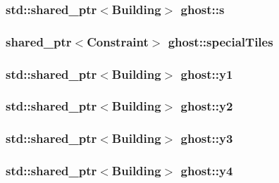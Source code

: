 \hypertarget{namespaceghost_a21eab9fd4ae07c7db20e824cc4452a97}{
\subsubsection[{s}]{\setlength{\rightskip}{0pt plus 5cm}std\-::shared\-\_\-ptr$<${\bf Building}$>$ ghost\-::s}}\label{namespaceghost_a21eab9fd4ae07c7db20e824cc4452a97}
\hypertarget{namespaceghost_a41140633099e7f2158ce39ca3a469abb}{
\subsubsection[{special\-Tiles}]{\setlength{\rightskip}{0pt plus 5cm}shared\-\_\-ptr$<${\bf Constraint}$>$ ghost\-::special\-Tiles}}\label{namespaceghost_a41140633099e7f2158ce39ca3a469abb}
\hypertarget{namespaceghost_af02ccfe4153013ca001f67b21cb8ba43}{
\subsubsection[{y1}]{\setlength{\rightskip}{0pt plus 5cm}std\-::shared\-\_\-ptr$<${\bf Building}$>$ ghost\-::y1}}\label{namespaceghost_af02ccfe4153013ca001f67b21cb8ba43}
\hypertarget{namespaceghost_ab6fc6f6a8069edbc2ae66e3f4c95e988}{
\subsubsection[{y2}]{\setlength{\rightskip}{0pt plus 5cm}std\-::shared\-\_\-ptr$<${\bf Building}$>$ ghost\-::y2}}\label{namespaceghost_ab6fc6f6a8069edbc2ae66e3f4c95e988}
\hypertarget{namespaceghost_a48fd5802a1f5deeffa729a4be630b172}{
\subsubsection[{y3}]{\setlength{\rightskip}{0pt plus 5cm}std\-::shared\-\_\-ptr$<${\bf Building}$>$ ghost\-::y3}}\label{namespaceghost_a48fd5802a1f5deeffa729a4be630b172}
\hypertarget{namespaceghost_a959bf3d4c6eabc2dda3faeed7e7ea7a9}{
\subsubsection[{y4}]{\setlength{\rightskip}{0pt plus 5cm}std\-::shared\-\_\-ptr$<${\bf Building}$>$ ghost\-::y4}}\label{namespaceghost_a959bf3d4c6eabc2dda3faeed7e7ea7a9}
